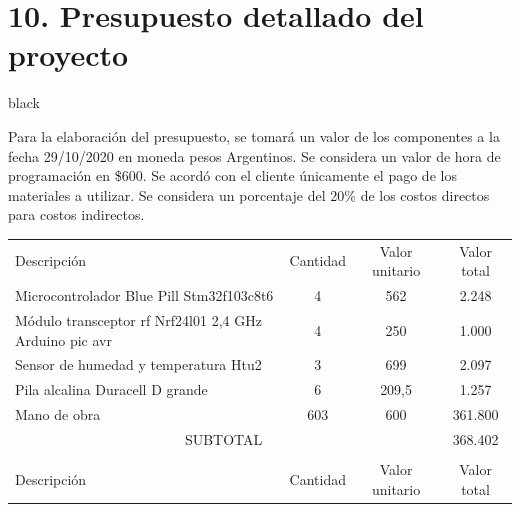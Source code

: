 \documentclass[11pt]{charter}
\begin{document}
\section{10. Presupuesto detallado del proyecto}
\label{sec:presupuesto}

\begin{consigna}{black}

Para la elaboración del presupuesto, se tomará un valor de los componentes a la fecha 29/10/2020 en moneda pesos Argentinos. Se considera un valor de hora de programación en \$600. Se acordó con el cliente únicamente el pago de los materiales a utilizar. Se considera un porcentaje del 20\% de los costos directos para costos indirectos.

\end{consigna}

\begin{table}[htpb]
\centering
\begin{tabularx}{\linewidth}{@{}|X|c|r|r|@{}}
\hline
\rowcolor[HTML]{C0C0C0} 
\multicolumn{4}{|c|}{\cellcolor[HTML]{C0C0C0}COSTOS DIRECTOS} \\ \hline
\rowcolor[HTML]{C0C0C0} 
Descripción &
  \multicolumn{1}{c|}{\cellcolor[HTML]{C0C0C0}Cantidad} &
  \multicolumn{1}{c|}{\cellcolor[HTML]{C0C0C0}Valor unitario} &
  \multicolumn{1}{c|}{\cellcolor[HTML]{C0C0C0}Valor total} \\ \hline
  
  Microcontrolador Blue Pill Stm32f103c8t6 &  
  \multicolumn{1}{c|}{4} & 
  \multicolumn{1}{c|}{562} &
  \multicolumn{1}{c|}{2.248} \\ \hline
  
  Módulo transceptor rf Nrf24l01 2,4 GHz Arduino pic avr &
  \multicolumn{1}{c|}{4} &
  \multicolumn{1}{c|}{250} &
  \multicolumn{1}{c|}{1.000} \\ \hline
  
  
  Sensor de humedad y temperatura Htu2 &
  \multicolumn{1}{c|}{3} &
  \multicolumn{1}{c|}{699} &
  \multicolumn{1}{c|}{2.097} \\ \hline
   
  Pila alcalina Duracell D grande &
  \multicolumn{1}{c|}{6} &
  \multicolumn{1}{c|}{209,5} &
  \multicolumn{1}{c|}{1.257} \\ \hline
  
  Mano de obra &
  \multicolumn{1}{c|}{603} &
  \multicolumn{1}{c|}{600} &
  \multicolumn{1}{c|}{361.800} \\ \hline
  
\multicolumn{3}{|c|}{SUBTOTAL} &
  \multicolumn{1}{c|}{368.402} \\ \hline
\rowcolor[HTML]{C0C0C0} 
\multicolumn{4}{|c|}{\cellcolor[HTML]{C0C0C0}COSTOS INDIRECTOS} \\ \hline
\rowcolor[HTML]{C0C0C0} 
Descripción & 
  \multicolumn{1}{c|}{\cellcolor[HTML]{C0C0C0}Cantidad} &
  \multicolumn{1}{c|}{\cellcolor[HTML]{C0C0C0}Valor unitario} &
  \multicolumn{1}{c|}{\cellcolor[HTML]{C0C0C0}Valor total} \\ \hline
  

\end{tabularx}
\end{table}
\end{document}
